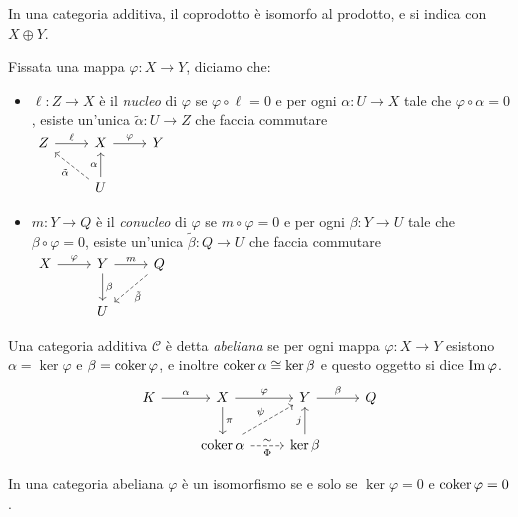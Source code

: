 \begin{proposition}
    In una categoria additiva, il coprodotto è isomorfo al prodotto, e si indica con $X\oplus Y$.
\end{proposition}

\begin{definition}
    Fissata una mappa $\varphi: X\to Y$, diciamo che:
    \begin{itemize}
        \item $\ell:Z\to X$ è il \emph{nucleo} di $\varphi$ se $\varphi\circ\ell=0$ e per ogni $\alpha: U\to X$ tale che $\varphi\circ \alpha=0$, esiste un'unica $\tilde\alpha:U\to Z$ che faccia commutare\\
        $\begin{tikzcd}
        Z \ar[r, "\ell"] & X \ar[r, "\varphi"] & Y \\
         & U \ar[u,"\alpha"] \ar[ul, dashrightarrow, "\tilde\alpha"]
        \end{tikzcd}$
        \item $m:Y\to Q$ è il \emph{conucleo} di $\varphi$ se $m\circ\varphi=0$ e per ogni $\beta: Y\to U$ tale che $\beta\circ\varphi=0$, esiste un'unica $\tilde\beta:Q\to U$ che faccia commutare\\
        $\begin{tikzcd}
        X \ar[r, "\varphi"] & Y \ar[r, "m"] \ar[d,"\beta"] & Q \ar[dl, dashrightarrow, "\tilde\beta"] \\
        & U 
        \end{tikzcd}$
    \end{itemize}
\end{definition}

\begin{definition}
    Una categoria additiva $\mathcal{C}$ è detta \emph{abeliana} se per ogni mappa $\varphi: X\to Y$ esistono $\alpha=\ker\varphi$ e $\beta=\operatorname{coker}\varphi$, e inoltre $\operatorname{coker}\alpha\cong\ker\beta$ e questo oggetto si dice $\operatorname{Im}\varphi$.
    $$\begin{tikzcd}
    K \ar[r,"\alpha"] & X \ar[r,"\varphi"] \ar[d, "\pi"] & Y \ar[r,"\beta"] & Q \\
     & \coker\alpha \ar[ur, dashrightarrow, "\psi"] \ar[r, dashrightarrow, "\Phi"',"\sim"] & \ker\beta \ar[u,"j"] &
    \end{tikzcd}$$
\end{definition}

\begin{proposition}
    In una categoria abeliana $\varphi$ è un isomorfismo se e solo se $\ker\varphi=0$ e $\operatorname{coker}\varphi=0$.
\end{proposition}

